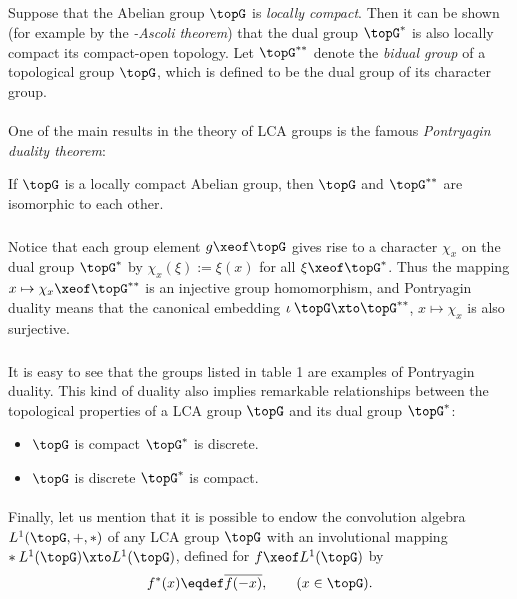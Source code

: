 \documentclass[11pt,twoside]{article}
\begin{document}
\subparagraph{}
Suppose that the Abelian group ${\topG}$ is \textit{locally compact}.
Then it can be shown (for example by the \textit{{\ARZELA}-Ascoli theorem})
that the dual group $\topG^*$ is also locally compact
{\wrt} its compact-open topology.
Let $\topG^{**}$ denote the \textit{bidual group} 
of a topological group $\topG$,
which is defined to be the dual group of its character group.

\paragraph{} %
One of the main results in the theory of LCA groups is the famous
\textit{Pontryagin duality theorem}:

\begin{theorem1}\label{PONTRYAGIN_DUALITY_THEOREM}
If $\topG$ is a locally compact Abelian group,
then $\topG$ and $\topG^{**}$ are isomorphic to each other.
\end{theorem1}

\subparagraph{}
Notice that
each group element $g \xeof \topG$ gives rise to a character $\chi_x$
on the dual group $\topG^*$ by
$\chi_x(\xi) := \xi(x)$ for all $\xi \xeof \topG^*$.
Thus the mapping $x \mapsto \chi_x \xeof \topG^{**}$ is an injective group
homomorphism,
and Pontryagin duality means
that the canonical embedding $\iota \: \topG \xto \topG^{**}$,
$x \mapsto \chi_x$ is also surjective.

\subparagraph{}
It is easy to see
that the groups listed in table 1 are examples of Pontryagin duality.
This kind of duality also implies remarkable relationships between
the topological properties of a LCA group $\topG$ and its dual group $\topG^*$:

\begin{itemize}[leftmargin=15pt]
\item[1.]
$\topG$ is compact \iff $\topG^*$ is discrete.

\item[2.]
$\topG$ is discrete \iff $\topG^*$ is compact.
\end{itemize}

\paragraph{}
Finally,
let us mention
that it is possible to endow the convolution algebra $L^1(\topG,+,\ast)$
of any LCA group $\topG$
with an involutional mapping $* \:L^1(\topG) \xto L^1(\topG)$,
defined for $f \xeof L^1(\topG)$ by
\[
f^*(x) \eqdef \overline{f(-x)}, \quad \quad (x \in \topG).
\]
\end{document}
